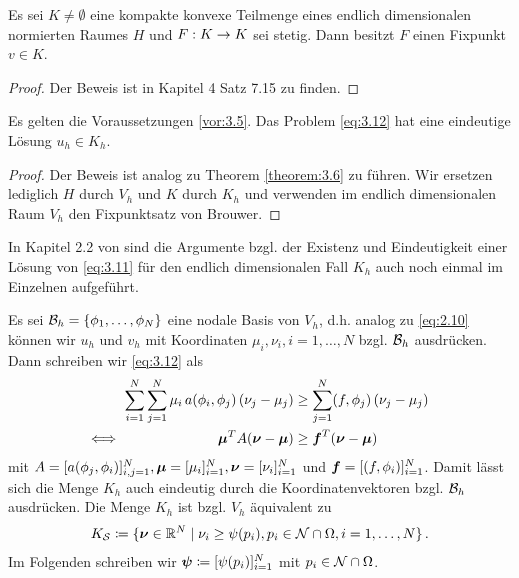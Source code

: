 \begin{satz}\label{satz:3.9}
Es sei $K \not= \emptyset$ eine kompakte konvexe Teilmenge eines endlich dimensionalen normierten Raumes $H$ und $F: K \rightarrow K$ sei stetig. Dann besitzt $F$ einen Fixpunkt $v \in K$.
\end{satz}

\begin{proof}
Der Beweis ist in \cite{Werner} Kapitel 4 Satz 7.15 zu finden.
\end{proof}

\begin{theorem}\label{theorem:3.10}
Es gelten die Voraussetzungen \ref{vor:3.5}. Das Problem \eqref{eq:3.12} hat eine eindeutige Lösung $u_h \in K_h$.
\end{theorem}

\begin{proof}
Der Beweis ist analog zu Theorem \ref{theorem:3.6} zu führen. Wir ersetzen lediglich $H$ durch $V_h$ und $K$ durch $K_h$ und verwenden im endlich dimensionalen Raum $V_h$ den Fixpunktsatz von Brouwer.
\end{proof}


 \begin{bem*}
In Kapitel 2.2 von \cite{StarkePDE} sind die Argumente bzgl. der Existenz und Eindeutigkeit einer Lösung von \eqref{eq:3.11} für den endlich dimensionalen Fall $K_h$ auch noch einmal im Einzelnen aufgeführt.
\end{bem*}

Es sei $\mathcal B_h = \{\phi_1,\ldots,\phi_N\}$ eine nodale Basis von $V_h$, d.h. analog zu \eqref{eq:2.10} können wir $u_h$ und $v_h$ mit Koordinaten $\mu_i,\nu_i, i = 1,\ldots,N$ bzgl. $\mathcal B_h$ ausdrücken. Dann schreiben wir \eqref{eq:3.12} als
\begin{align*}
	\sum_{i = 1}^N\sum_{j=1}^N \mu_i \, a(\phi_i,\phi_j)\, (\nu_j-\mu_j) & \ge \sum_{j=1}^N  (f,\phi_j) \, (\nu_j-\mu_j)  \\
	\Longleftrightarrow\quad \qquad  \qquad \qquad \boldsymbol \mu^T A (\boldsymbol \nu- \boldsymbol\mu) &  \ge \boldsymbol f^T (\boldsymbol \nu-\boldsymbol \mu)
\end{align*}
mit $A = [a(\phi_j,\phi_i)]_{i,j=1}^N, \boldsymbol \mu = [\mu_i]_{i=1}^N,\boldsymbol \nu = [\nu_i]_{i=1}^N$ und $\boldsymbol f = [(f,\phi_i)]_{i=1}^N$. Damit lässt sich die Menge $K_h$ auch eindeutig durch die Koordinatenvektoren bzgl. $\mathcal B_h$ ausdrücken. Die Menge $K_h$ ist bzgl. $V_h$ äquivalent zu
\begin{align}\label{eq:3.13}
	K_{\mathcal S} \coloneqq \{\boldsymbol \nu \in \mathbb{R}^N \mid \nu_i \ge \psi(p_i) , p_i \in \mathcal N \cap \Omega, i = 1,\ldots, N \} \, .
\end{align}
Im Folgenden schreiben wir $\boldsymbol \psi \coloneqq [\psi(p_i)]_{i=1}^N$ mit $p_i \in \mathcal N\cap \Omega$.


